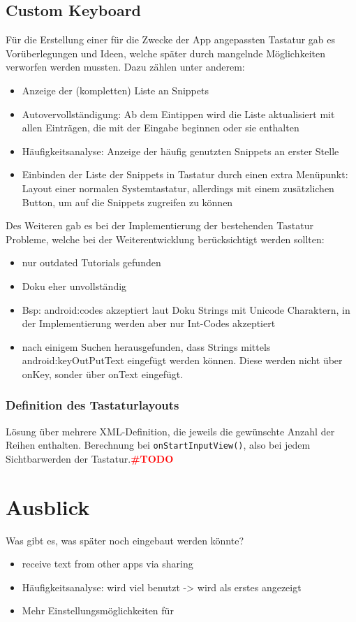 \documentclass[11pt]{article}
\begin{document}
			
	\subsection{Custom Keyboard}
		Für die Erstellung einer für die Zwecke der App angepassten Tastatur gab es Vorüberlegungen und Ideen, welche später durch mangelnde Möglichkeiten verworfen werden mussten. Dazu zählen unter anderem: 
		\begin{itemize}
			\item Anzeige der (kompletten) Liste an Snippets 
			\item Autovervollständigung: Ab dem Eintippen wird die Liste aktualisiert mit allen Einträgen, die mit der Eingabe beginnen oder sie enthalten
			\item Häufigkeitsanalyse: Anzeige der häufig genutzten Snippets an erster Stelle
			\item Einbinden der Liste der Snippets in Tastatur durch einen extra Menüpunkt: Layout einer normalen Systemtastatur, allerdings mit einem zusätzlichen Button, um auf die Snippets zugreifen zu können
		\end{itemize}
		
		Des Weiteren gab es bei der Implementierung der bestehenden Tastatur Probleme, welche bei der Weiterentwicklung berücksichtigt werden sollten:
		\begin{itemize}
			\item nur outdated Tutorials gefunden
			\item Doku eher unvollständig
			\item Bsp: android:codes akzeptiert laut Doku Strings mit Unicode Charaktern, in der Implementierung werden aber nur Int-Codes akzeptiert
			\item nach einigem Suchen herausgefunden, dass Strings mittels android:keyOutPutText eingefügt werden können. Diese werden nicht über onKey, sonder über onText eingefügt.
		\end{itemize}
		\subsubsection{Definition des Tastaturlayouts}
			Lösung über mehrere XML-Definition, die jeweils die gewünschte Anzahl der Reihen enthalten. Berechnung bei \lstinline|onStartInputView()|, also bei jedem Sichtbarwerden der Tastatur.\textcolor{red}{\textbf{{\LARGE \#TODO}}}
	
\section{Ausblick}
	Was gibt es, was später noch eingebaut werden könnte?
	\begin{itemize}
		\item receive text from other apps via sharing
		\item Häufigkeitsanalyse: wird viel benutzt -> wird als erstes angezeigt
		\item Mehr Einstellungsmöglichkeiten für 
	\end{itemize}
	
\end{document}
